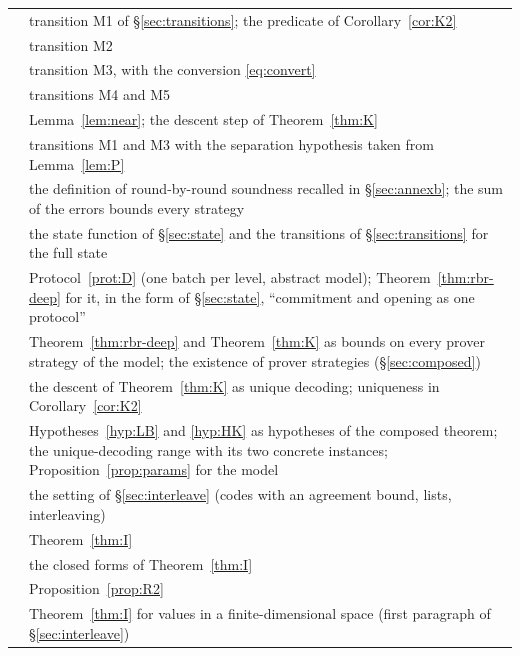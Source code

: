 {\begin{longtable}{@{}L{0.34\textwidth}L{0.62\textwidth}@{}}
 & transition M1 of \S\ref{sec:transitions}; the predicate of Corollary~\ref{cor:K2}\\
 & transition M2\\
 & transition M3, with the conversion \eqref{eq:convert}\\
 & transitions M4 and M5\\
 & Lemma~\ref{lem:near}; the descent step of Theorem~\ref{thm:K}\\
 & transitions M1 and M3 with the separation hypothesis taken from Lemma~\ref{lem:P}\\
\addlinespace
{} & the definition of round-by-round soundness recalled in \S\ref{sec:annexb}; the sum of the errors bounds every strategy\\
 & the state function of \S\ref{sec:state} and the transitions of \S\ref{sec:transitions} for the full state\\
 & Protocol~\ref{prot:D} (one batch per level, abstract model); Theorem~\ref{thm:rbr-deep} for it, in the form of \S\ref{sec:state}, ``commitment and opening as one protocol''\\
 & Theorem~\ref{thm:rbr-deep} and Theorem~\ref{thm:K} as bounds on every prover strategy of the model; the existence of prover strategies (\S\ref{sec:composed})\\
 & the descent of Theorem~\ref{thm:K} as unique decoding; uniqueness in Corollary~\ref{cor:K2}\\
 & Hypotheses~\ref{hyp:LB} and \ref{hyp:HK} as hypotheses of the composed theorem; the unique-decoding range with its two concrete instances; Proposition~\ref{prop:params} for the model\\
\addlinespace
{} & the setting of \S\ref{sec:interleave} (codes with an agreement bound, lists, interleaving)\\
 & Theorem~\ref{thm:I}\\
 & the closed forms of Theorem~\ref{thm:I}\\
 & Proposition~\ref{prop:R2}\\
 & Theorem~\ref{thm:I} for values in a finite-dimensional space (first paragraph of \S\ref{sec:interleave})\\

\end{longtable}}
